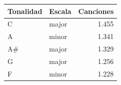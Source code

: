 \begin{center}\small
{}\label{tab:tonalidades}
\begin{tabularx}{\linewidth}{@{}Y Y r@{}}
\toprule
\textbf{Tonalidad} & \textbf{Escala} & \textbf{Canciones} \\
\midrule
C & major & 1.455 \\
A & minor & 1.341 \\
A\# & major & 1.329 \\
G & major & 1.256 \\
F & minor & 1.228 \\
\bottomrule
\end{tabularx}
\end{center}
